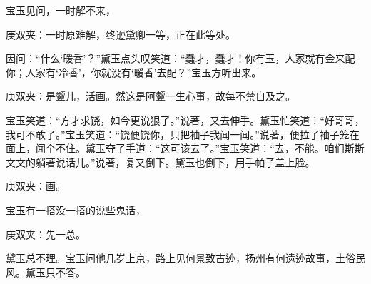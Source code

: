 \begin{parag}
    宝玉见问，一时解不来，\begin{note}庚双夹：一时原难解，终逊黛卿一等，正在此等处。\end{note}因问：“什么‘暖香’？”黛玉点头叹笑道：“蠢才，蠢才！你有玉，人家就有金来配你；人家有‘冷香’，你就没有‘暖香’去配？”宝玉方听出来。\begin{note}庚双夹：是颦儿，活画。然这是阿颦一生心事，故每不禁自及之。\end{note}宝玉笑道：“方才求饶，如今更说狠了。”说著，又去伸手。黛玉忙笑道：“好哥哥，我可不敢了。”宝玉笑道：“饶便饶你，只把袖子我闻一闻。”说著，便拉了袖子笼在面上，闻个不住。黛玉夺了手道：“这可该去了。”宝玉笑道：“去，不能。咱们斯斯文文的躺著说话儿。”说著，复又倒下。黛玉也倒下，用手帕子盖上脸。\begin{note}庚双夹：画。\end{note}宝玉有一搭没一搭的说些鬼话，\begin{note}庚双夹：先一总。\end{note}黛玉总不理。宝玉问他几岁上京，路上见何景致古迹，扬州有何遗迹故事，土俗民风。黛玉只不答。
\end{parag}


